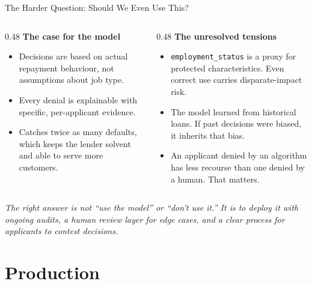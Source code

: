 \documentclass[aspectratio=169, 10pt]{beamer}
\begin{document}
\begin{frame}{The Harder Question: Should We Even Use This?}
 \begin{columns}[T]

 \begin{column}{0.48\textwidth}
 \textbf{The case for the model}
 \begin{itemize}
 \item Decisions are based on actual repayment
 behaviour, not assumptions about job type.
 \vspace{0.4em}
 \item Every denial is explainable with
 specific, per-applicant evidence.
 \vspace{0.4em}
 \item Catches twice as many defaults, which
 keeps the lender solvent and able to
 serve more customers.
 \end{itemize}
 \end{column}

 \begin{column}{0.48\textwidth}
 \textbf{The unresolved tensions}
 \begin{itemize}
 \item \texttt{employment\_status} is a proxy
 for protected characteristics. Even
 correct use carries disparate-impact risk.
 \vspace{0.4em}
 \item The model learned from historical loans.
 If past decisions were biased, it
 inherits that bias.
 \vspace{0.4em}
 \item An applicant denied by an algorithm
 has less recourse than one denied
 by a human. That matters.
 \end{itemize}
 \end{column}

 \end{columns}

 \vspace{0.5em}
 \footnotesize \emph{The right answer is not ``use the model'' or ``don't use it.''
 It is to deploy it with ongoing audits, a human review layer for edge cases,
 and a clear process for applicants to contest decisions.}
\end{frame}

\section{Production}
\end{document}
